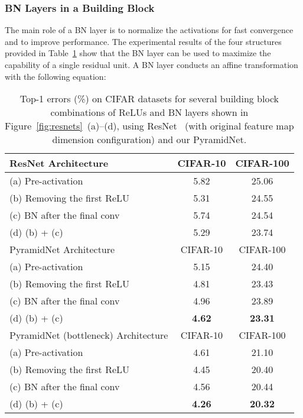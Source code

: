 \documentclass[10pt,twocolumn,letterpaper]{article}
\begin{document}
\subsubsection{BN Layers in a Building Block}
The main role of a BN layer is to normalize the activations for fast convergence and to improve performance.
The experimental results of the four structures provided in Table~\ref{table:compare} show that the BN layer can be used to maximize the capability of a single residual unit. A BN layer conducts an affine transformation with the following equation:

\begin{table}[t]
\fontsize{7}{8}\selectfont
\begin{center}
\begin{tabular}{|l|c|c|}
\hline
ResNet Architecture  & CIFAR-10 & CIFAR-100\\
\hline
(a) Pre-activation~\cite{preresnet} & 5.82 & 25.06\\
(b) Removing the first ReLU & 5.31 & 24.55\\
(c) BN after the final conv & 5.74 & 24.54 \\
(d) (b) + (c) & 5.29 & 23.74 \\
\hline\hline
PyramidNet Architecture & CIFAR-10 & CIFAR-100\\
\hline
(a) Pre-activation~\cite{preresnet} & 5.15 & 24.40\\
(b) Removing the first ReLU & 4.81 & 23.43\\
(c) BN after the final conv & 4.96 & 23.89\\
(d) (b) + (c) & {\bf4.62} & {\bf23.31}\\
\hline\hline
PyramidNet (bottleneck) Architecture  & CIFAR-10 & CIFAR-100\\
\hline
(a) Pre-activation~\cite{preresnet} & 4.61 & 21.10\\
(b) Removing the first ReLU  & 4.45 & 20.40\\
(c) BN after the final conv & 4.56 & 20.44\\
(d) (b) + (c)  & {\bf4.26} & {\bf20.32}\\
\hline
\end{tabular}
\end{center}
\caption{Top-1 errors (\%) on CIFAR datasets for several building block combinations of ReLUs and BN layers shown in Figure~\ref{fig:resnets}~(a)--(d), using ResNet~\cite{preresnet} (with original feature map dimension configuration) and our PyramidNet.}
\label{table:compare}
\vspace{-3mm}
\end{table}
\end{document}
